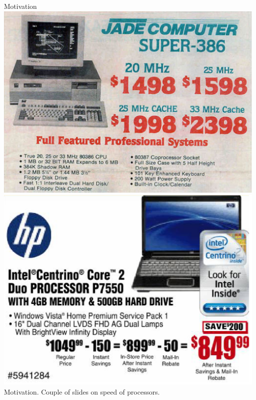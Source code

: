 \documentclass[10pt]{beamer}
\begin{document}

\begin{frame}{Motivation}
\includegraphics[width=0.5\linewidth]{img/old_ad}
\includegraphics[width=0.5\linewidth]{img/2006_ad}
Motivation. Couple of slides on speed of processors.
\end{frame}
\end{document}
